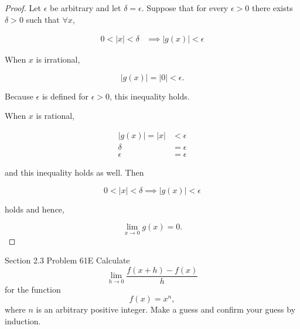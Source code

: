 \documentclass{article}
\begin{document}
    \begin{proof}
        Let $\epsilon$ be arbitrary and let $\delta = \epsilon$. Suppose that for every $\epsilon > 0$ there exists $\delta > 0$ such that $\forall x$,

        \begin{align*}
            0 < |x| < \delta & \implies |g(x)| < \epsilon
        \end{align*}

        When $x$ is irrational,

        \[
            |g(x)| = |0| < \epsilon.
        \]

        Because $\epsilon$ is defined for $\epsilon > 0$, this inequality holds.

        \pagebreak
        \thispagestyle{page3}

        When $x$ is rational,

        \begin{align*}
            |g(x)| = |x| &< \epsilon \\
                     \delta &= \epsilon \\
                    \epsilon &= \epsilon
        \end{align*}

        and this inequality holds as well. Then

        \[
            0 < |x| < \delta \implies |g(x)| < \epsilon
        \]

        holds and hence,

        \[
            \lim_{x\to 0} g(x) = 0.
        \]
    \end{proof}

    \begin{tbhtheorem}{Section 2.3 Problem 61E}
        Calculate
        \[
            \lim_{h\to 0} \frac{f(x+h)-f(x)}{h}
        \]
        for the function
        \[
            f(x) = x^n,
        \]
        where $n$ is an arbitrary positive integer. Make a guess and confirm your guess by induction.
    \end{tbhtheorem}
\end{document}
